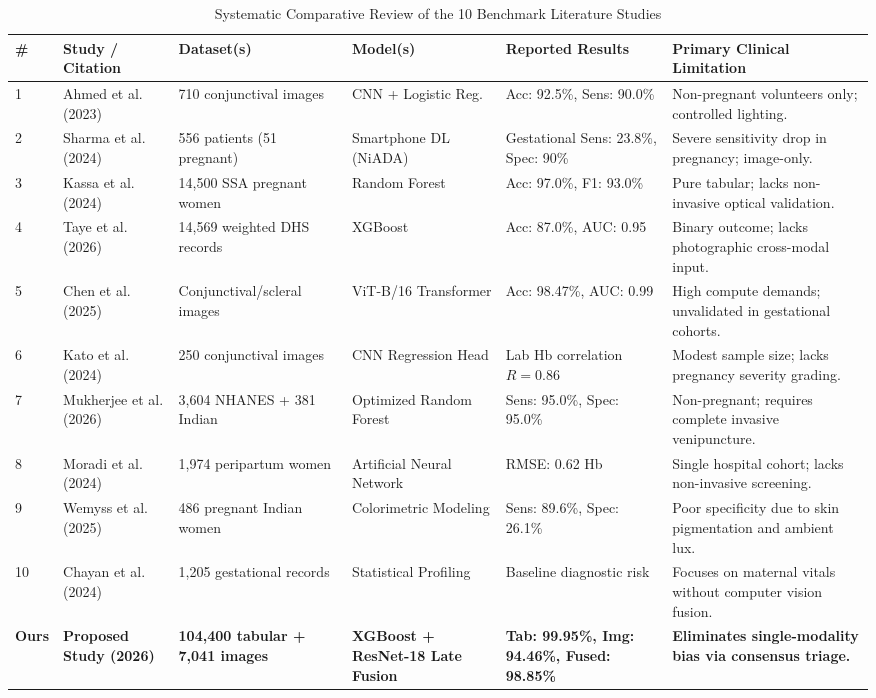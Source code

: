 \documentclass[journal,10pt,twocolumn]{IEEEtran}
\begin{document}
\begin{table}[t]
\centering
\caption{Systematic Comparative Review of the 10 Benchmark Literature Studies}
\label{tab:literature}
\renewcommand{\arraystretch}{1.2}
\begin{tabularx}{\textwidth}{lp{3.4cm}p{3.2cm}p{2.6cm}p{3.2cm}p{3.3cm}}
\toprule
\textbf{\#} & \textbf{Study / Citation} & \textbf{Dataset(s)} & \textbf{Model(s)} & \textbf{Reported Results} & \textbf{Primary Clinical Limitation} \\
\midrule
1 & Ahmed et al. (2023) \cite{conjunctiva2023detection} & 710 conjunctival images & CNN + Logistic Reg. & Acc: 92.5\%, Sens: 90.0\% & Non-pregnant volunteers only; controlled lighting. \\
2 & Sharma et al. (2024) \cite{niada2024cureus} & 556 patients (51 pregnant) & Smartphone DL (NiADA) & Gestational Sens: 23.8\%, Spec: 90\% & Severe sensitivity drop in pregnancy; image-only. \\
3 & Kassa et al. (2024) \cite{ethiopian_dhs2024} & 14,500 SSA pregnant women & Random Forest & Acc: 97.0\%, F1: 93.0\% & Pure tabular; lacks non-invasive optical validation. \\
4 & Taye et al. (2026) \cite{taye2026machine} & 14,569 weighted DHS records & XGBoost & Acc: 87.0\%, AUC: 0.95 & Binary outcome; lacks photographic cross-modal input. \\
5 & Chen et al. (2025) \cite{vit_conjunctiva2025} & Conjunctival/scleral images & ViT-B/16 Transformer & Acc: 98.47\%, AUC: 0.99 & High compute demands; unvalidated in gestational cohorts. \\
6 & Kato et al. (2024) \cite{kato2024hemoglobin} & 250 conjunctival images & CNN Regression Head & Lab Hb correlation $R=0.86$ & Modest sample size; lacks pregnancy severity grading. \\
7 & Mukherjee et al. (2026) \cite{ijmr2026inflammation} & 3,604 NHANES + 381 Indian & Optimized Random Forest & Sens: 95.0\%, Spec: 95.0\% & Non-pregnant; requires complete invasive venipuncture. \\
8 & Moradi et al. (2024) \cite{scirep2024postdelivery} & 1,974 peripartum women & Artificial Neural Network & RMSE: 0.62 Hb & Single hospital cohort; lacks non-invasive screening. \\
9 & Wemyss et al. (2025) \cite{wemyss2025smartphone} & 486 pregnant Indian women & Colorimetric Modeling & Sens: 89.6\%, Spec: 26.1\% & Poor specificity due to skin pigmentation and ambient lux. \\
10 & Chayan et al. (2024) \cite{maternal_survey2024synthesis} & 1,205 gestational records & Statistical Profiling & Baseline diagnostic risk & Focuses on maternal vitals without computer vision fusion. \\
\midrule
\textbf{Ours} & \textbf{Proposed Study (2026)} & \textbf{104,400 tabular + 7,041 images} & \textbf{XGBoost + ResNet-18 Late Fusion} & \textbf{Tab: 99.95\%, Img: 94.46\%, Fused: 98.85\%} & \textbf{Eliminates single-modality bias via consensus triage.} \\
\bottomrule
\end{tabularx}
\end{table}
\end{document}
